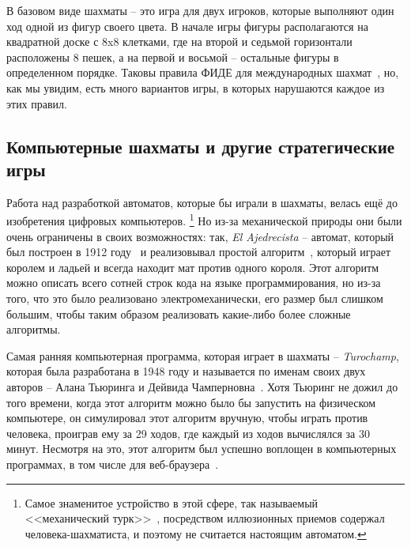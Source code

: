 \documentclass{article}
\begin{document}
В базовом виде шахматы -- это игра для двух игроков,
которые выполняют один ход одной из фигур своего цвета. 
В начале игры фигуры располагаются на квадратной доске с 8x8 клетками,
где на второй и седьмой горизонтали расположены 8 пешек,
а на первой и восьмой -- остальные фигуры в определенном порядке.
Таковы правила ФИДЕ для международных шахмат~\cite{fide-laws},
но, как мы увидим, есть много вариантов игры,
в которых нарушаются каждое из этих правил.

\subsection{Компьютерные шахматы и другие стратегические игры}

Работа над разработкой автоматов, которые бы играли в шахматы,
велась ещё до изобретения цифровых компьютеров.
\footnote{Самое знаменитое устройство в этой сфере, так называемый <<механический турк>>~\cite{mechturk},
посредством иллюзионных приемов содержал человека-шахматиста,
и поэтому не считается настоящим автоматом.}
Но из-за механической природы они были очень ограничены в своих возможностях:
так, \emph{El Ajedrecista} -- автомат, который был построен в 1912 году~\cite{ajedrecista-article}
и реализовывал простой алгоритм~\cite{ajedrecista-algo}, который играет королем и ладьей
и всегда находит мат против одного короля.
Этот алгоритм можно описать всего сотней строк кода на языке программирования,
но из-за того, что это было реализовано электромеханически,
его размер был слишком большим,
чтобы таким образом реализовать какие-либо более сложные алгоритмы.

Самая ранняя компьютерная программа, которая играет в шахматы --
\emph{Turochamp}, которая была разработана в 1948 году 
и называется по именам своих двух авторов -- Алана Тьюринга и Дейвида Чамперновна~\cite{turochamp}.
Хотя Тьюринг не дожил до того времени, когда этот алгоритм можно было бы запустить на физическом компьютере,
он симулировал этот алгоритм вручную, чтобы играть против человека,
проиграв ему за 29 ходов,
где каждый из ходов вычислялся за 30 минут. 
Несмотря на это, этот алгоритм был успешно воплощен в компьютерных программах,
в том числе для веб-браузера~\cite{nimturochamp}.
\end{document}
